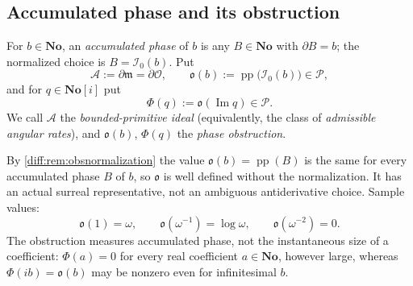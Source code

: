 \documentclass[11pt,letterpaper]{article}
\numberwithin{equation}{section}
\theoremstyle{definition}
\theoremstyle{remark}
\newcommand{\No}{\mathbf{No}}
\newcommand{\SC}{\mathbf{No}[i]}
\newcommand{\der}{\partial}
\newcommand{\Ofin}{\mathcal O}
\newcommand{\mm}{\mathfrak m}
\newcommand{\Pcl}{\mathcal P}
\newcommand{\Acl}{\mathcal A}
\newcommand{\Izero}{\mathcal I_{0}}
\newcommand{\Obs}{\mathfrak o}
\newcommand{\pp}{\operatorname{pp}}
\newcommand{\Imm}{\operatorname{Im}}
\begin{document}
\subsection{Accumulated phase and its obstruction}
\label{diff:sub:accumulated}

\begin{definition}
\label{diff:def:obs}
For $b\in\No$, an \emph{accumulated phase} of $b$ is any $B\in\No$ with
$\der B=b$; the normalized choice is $B=\Izero(b)$. Put
\[
 \Acl:=\der\mm=\der\Ofin,
 \qquad
 \Obs(b):=\pp\bigl(\Izero(b)\bigr)\in\Pcl ,
\]
and for $q\in\SC$ put
\[
 \Phi(q):=\Obs(\Imm q)\in\Pcl .
\]
We call $\Acl$ the \emph{bounded-primitive ideal} (equivalently, the class of
\emph{admissible angular rates}), and $\Obs(b)$, $\Phi(q)$ the \emph{phase
obstruction}.
\end{definition}

By \cref{diff:rem:obsnormalization} the value $\Obs(b)=\pp(B)$ is the same for
every accumulated phase $B$ of $b$, so $\Obs$ is well defined without the
normalization. It has an actual surreal representative, not an ambiguous
antiderivative choice. Sample values:
\begin{equation}\label{diff:eq:obsexamples}
 \Obs(1)=\omega,\qquad
 \Obs(\omega^{-1})=\log\omega,\qquad
 \Obs(\omega^{-2})=0 .
\end{equation}
The obstruction measures accumulated phase, not the instantaneous size of a
coefficient: $\Phi(a)=0$ for every real coefficient $a\in\No$, however
large, whereas $\Phi(ib)=\Obs(b)$ may be nonzero even for infinitesimal $b$.
\end{document}
